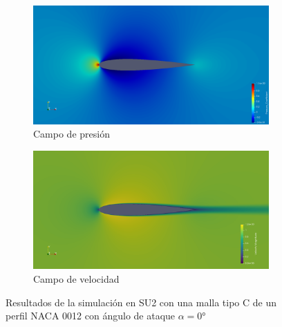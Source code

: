 \documentclass[letterpaper, openright, 12pt]{book}
\begin{document}
    \begin{figure}[htbp!]
        \centering
        \begin{subfigure}[c]{0.48\textwidth}
            \includegraphics[keepaspectratio, width=0.99\textwidth]
                {./img/su2/mc_cp_alfa_0}
            \caption{Campo de presión}
            \label{fig:mc_cp_o}
        \end{subfigure}
        \begin{subfigure}[c]{0.48\textwidth}
            \includegraphics[keepaspectratio, width=0.99\textwidth]
                {./img/su2/mc_vel_alfa_0}
            \caption{Campo de velocidad}
            \label{fig:mc_vel_0}
        \end{subfigure}
        \caption[Resultados de simulaciones para malla C en SU2]{Resultados
            de la simulación en SU2 con una malla tipo C de un perfil NACA 0012
            con ángulo de ataque $\alpha = 0\si{\degree}$}
        \label{fig:mc_su2_o}
    \end{figure}
\end{document}
